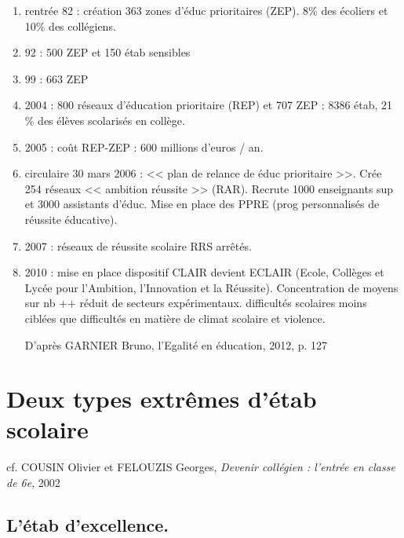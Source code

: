 \documentclass[12pt]{report}
\begin{document}
\begin{itemize}
\begin{itemize}
{\begin{minipage}{19cm}
\begin{enumerate}
\item rentrée 82 : création 363 zones d'éduc prioritaires (ZEP). 8\% des écoliers et 10\% des collégiens.\\
\item 92 : 500 ZEP et 150 étab sensibles \\
\item 99 : 663 ZEP \\
\item 2004 : 800 réseaux d'éducation prioritaire (REP) et 707 ZEP : 8386 étab, 21 \% des élèves scolarisés en collège.\\
\item 2005 : coût REP-ZEP :  600 millions d'euros / an. \\
\item circulaire 30 mars 2006 : << plan de relance de éduc prioritaire >>. Crée 254 réseaux << ambition réussite >> (RAR). Recrute 1000 enseignants sup et 3000 assistants d'éduc. Mise en place des PPRE (prog personnalisés de réussite éducative).\\
\item 2007 : réseaux de réussite scolaire RRS arrêtés. \\
\item 2010 : mise en place dispositif CLAIR devient ECLAIR (Ecole, Collèges et Lycée pour l'Ambition, l'Innovation et la Réussite). Concentration de moyens sur nb ++ réduit de secteurs expérimentaux. difficultés scolaires moins ciblées que difficultés en matière de climat scolaire et violence. \\
\begin{flushright}
D'après GARNIER Bruno, l'Egalité en éducation, 2012, p. 127
\end{flushright}


\end{enumerate}

\end{minipage}
}

\section{Deux types extrêmes d'étab scolaire}

cf. COUSIN Olivier et FELOUZIS Georges, \textit{Devenir collégien : l'entrée en classe de 6e}, 2002

\subsection{L'étab d'excellence.}


\end{itemize}
\end{itemize}
\end{document}
